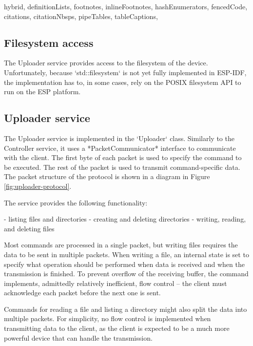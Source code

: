 \begin{markdown*}{%
  hybrid,
  definitionLists,
  footnotes,
  inlineFootnotes,
  hashEnumerators,
  fencedCode,
  citations,
  citationNbsps,
  pipeTables,
  tableCaptions,
}
\subsection{Filesystem access}

The Uploader service provides access to the filesystem of the device. Unfortunately, because `std::filesystem` is not yet fully implemented in ESP-IDF, the implementation has to, in some cases, rely on the POSIX filesystem API to run on the ESP platform.

\subsection{Uploader service}

The Uploader service is implemented in the `Uploader` class. Similarly to the Controller service, it uses a *PacketCommunicator* interface to communicate with the client. The first byte of each packet is used to specify the command to be executed. The rest of the packet is used to transmit command-specific data. The packet structure of the protocol is shown in a diagram in Figure \ref{fig:uploader-protocol}.

The service provides the following functionality:

  - listing files and directories
  - creating and deleting directories
  - writing, reading, and deleting files

Most commands are processed in a single packet, but writing files requires the data to be sent in multiple packets. When writing a file, an internal state is set to specify what operation should be performed when data is received and when the transmission is finished. To prevent overflow of the receiving buffer, the command implements, admittedly relatively inefficient, flow control -- the client must acknowledge each packet before the next one is sent.

Commands for reading a file and listing a directory might also split the data into multiple packets. For simplicity, no flow control is implemented when transmitting data to the client, as the client is expected to be a much more powerful device that can handle the transmission.


\end{markdown*}

